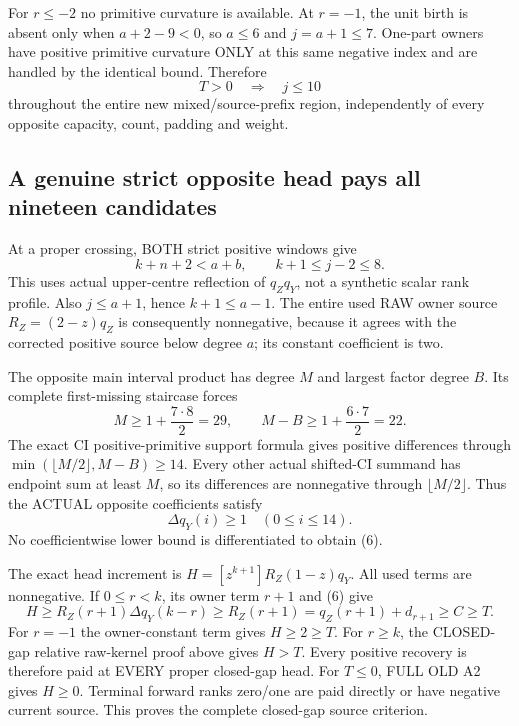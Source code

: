 \documentclass[11pt]{article}
\begin{document}
For $r\le-2$ no primitive curvature is available. At $r=-1$, the
unit birth is absent only when $a+2-9<0$, so $a\le6$ and $j=a+1\le7$.
One-part owners have positive primitive curvature ONLY at this same
negative index and are handled by the identical bound. Therefore
\[
             T>0\quad\Longrightarrow\quad j\le10       \tag{5}
\]
throughout the entire new mixed/source-prefix region, independently
of every opposite capacity, count, padding and weight.

\subsection{A genuine strict opposite head pays all nineteen candidates}
At a proper crossing, BOTH strict positive windows give
\[
                  k+n+2<a+b,\qquad k+1\le j-2\le8.
\]
This uses actual upper-centre reflection of $q_Zq_Y$, not a synthetic
scalar rank profile. Also $j\le a+1$, hence $k+1\le a-1$.
The entire used RAW owner source $R_Z=(2-z)q_Z$ is consequently
nonnegative, because it agrees with the corrected positive source
below degree $a$; its constant coefficient is two.

The opposite main interval product has degree $M$ and largest factor
degree $B$. Its complete first-missing staircase forces
\[
 M\ge1+\frac{7\cdot8}{2}=29,\qquad
 M-B\ge1+\frac{6\cdot7}{2}=22.
\]
The exact CI positive-primitive support formula gives positive
differences through $\min(\lfloor M/2\rfloor,M-B)\ge14$.
Every other actual shifted-CI summand has endpoint sum at least $M$,
so its differences are nonnegative through $\lfloor M/2\rfloor$.
Thus the ACTUAL opposite coefficients satisfy
\[
                       \Delta q_Y(i)\ge1\quad(0\le i\le14).      \tag{6}
\]
No coefficientwise lower bound is differentiated to obtain (6).

The exact head increment is $H=[z^{k+1}]R_Z(1-z)q_Y$.
All used terms are nonnegative. If $0\le r<k$, its owner term $r+1$
and (6) give
\[
 H\ge R_Z(r+1)\Delta q_Y(k-r)
   \ge R_Z(r+1)=q_Z(r+1)+d_{r+1}\ge C\ge T.
\]
For $r=-1$ the owner-constant term gives $H\ge2\ge T$.
For $r\ge k$, the CLOSED-gap relative raw-kernel proof above gives
$H>T$. Every positive recovery is therefore paid at EVERY proper
closed-gap head. For $T\le0$, FULL OLD A2 gives $H\ge0$.
Terminal forward ranks zero/one are paid directly or have negative
current source. This proves the complete closed-gap source criterion.
\end{document}

